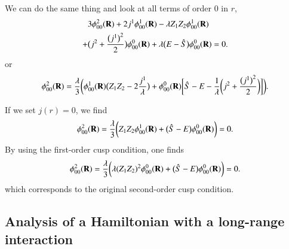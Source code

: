 \documentclass[aip,jcp,reprint,noshowkeys,superscriptaddress]{revtex4-1}
\newcommand{\bd}[1]{{\bf {#1}}}
\begin{document}
We can do the same thing and look at all terms of order $0$ in $r$, 
\begin{equation}
 \begin{aligned}
& 3 \phi_{00}^2(\bd{R}) + 2 j^1 \phi_{00}^1(\bd{R}) -\lambda Z_1 Z_2 \phi^1_{00}(\bd{R}) \\
+& \big( j^2 + \frac{\big(j^1\big)^2}{2}\big)\phi_{00}^0(\bd{R}) + \lambda\big( E - \hat{S} \big)\phi_{00}^0(\bd{R}) = 0. 
 \end{aligned}
\end{equation}
or 
\begin{equation}
 \phi_{00}^2(\bd{R}) = \frac{\lambda}{3}\bigg( \phi_{00}^1(\bd{R}) \big(  Z_1 Z_2 - 2 \frac{j^1}{\lambda} \big) + \phi_{00}^0(\bd{R}) \bigg[ \hat{S} - E - \frac{1}{\lambda}\bigg( j^2 + \frac{\big(j^1\big)^2}{2}\bigg) \bigg] \bigg).
\end{equation}

If we set $j(r)=0$, we  find 
\begin{equation}
 \phi_{00}^2(\bd{R}) = \frac{\lambda}{3} \bigg( Z_1 Z_2 \phi^1_{00}(\bd{R}) + \big( \hat{S} - E\big)\phi_{00}^0(\bd{R}) \bigg) = 0.
\end{equation}
By using the first-order cusp condition, one finds 
\begin{equation}
 \phi_{00}^2(\bd{R}) = \frac{\lambda}{3} \bigg( \lambda (Z_1 Z_2)^2 \phi^0_{00}(\bd{R}) + \big( \hat{S} - E\big)\phi_{00}^0(\bd{R}) \bigg) = 0.
\end{equation}
which corresponds to the original second-order cusp condition. 

\subsection{Analysis of a Hamiltonian with a long-range interaction}
\end{document}
